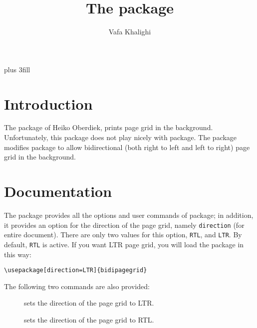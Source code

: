 \documentclass{ltxdoc}
\begin{document}
\title{The  package}
\author{Vafa Khalighi\\}
\maketitle
\vskip 0pt plus 3fill
\tableofcontents
\section{Introduction}
The  package of Heiko Oberdiek, prints page grid in the background. Unfortunately, this package does not play nicely with  package.
The  package modifies  package to allow bidirectional (both right to left and left to right) page grid in the background. 

\section{Documentation}
The  package provides all the options and user commands of  package; in addition, it provides an option for the direction of the page grid, namely \texttt{direction} (for entire document). There are only two values for this option, \texttt{RTL}, and \texttt{LTR}. By default, \texttt{RTL} is active. If you want LTR page grid, you will load the package in this way:
\begin{verbatim}
\usepackage[direction=LTR]{bidipagegrid}
\end{verbatim}


The following two commands are also provided:
\begin{description}
\item[] sets the direction of the page grid to LTR.
\item[] sets the direction of the page grid to RTL.
\end{description}
\end{document}
